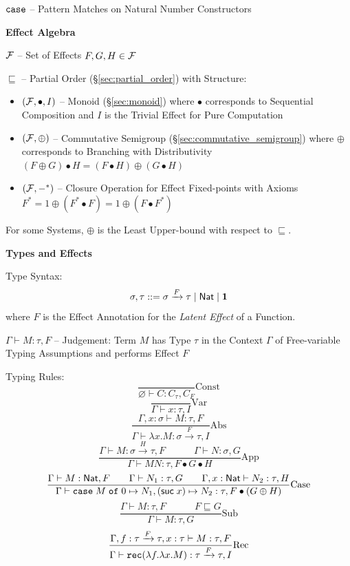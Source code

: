 $\mathtt{case}$ -- Pattern Matches on Natural Number Constructors


\textbf{Effect Algebra}

$\mathcal{F}$ -- Set of Effects $F,G,H \in \mathcal{F}$

$\sqsubseteq$ -- Partial Order (\S\ref{sec:partial_order}) with
Structure:
\begin{itemize}
  \item $(\mathcal{F},\bullet,I)$ -- Monoid (\S\ref{sec:monoid}) where
    $\bullet$ corresponds to Sequential Composition and $I$ is the
    Trivial Effect for Pure Computation
  \item $(\mathcal{F},\oplus)$ -- Commutative Semigroup
    (\S\ref{sec:commutative_semigroup}) where $\oplus$ corresponds to
    Branching with Distributivity $(F \oplus G) \bullet H = (F \bullet
    H) \oplus (G \bullet H)$
  \item $(\mathcal{F},-^*)$ -- Closure Operation for Effect Fixed-points
    with Axioms $F^* = 1 \oplus (F^* \bullet F) = 1 \oplus (F \bullet
    F^*)$
\end{itemize}
For some Systems, $\oplus$ is the Least Upper-bound with respect to
$\sqsubseteq$. %


\textbf{Types and Effects}

Type Syntax:
\[
  \sigma,\tau ::= \sigma \xrightarrow{F} \tau \mid \mathsf{Nat} \mid \mathbf{1}
\]
where $F$ is the Effect Annotation for the \emph{Latent Effect} of a
Function. %

$\Gamma \vdash M:\tau,F$ -- Judgement: Term $M$ has Type $\tau$ in the
Context $\Gamma$ of Free-variable Typing Assumptions and performs
Effect $F$

Typing Rules:
\[
  \frac{}{\varnothing \vdash C : C_\tau,C_F} \mathrm{Const}
\]\[
  \frac{}{\Gamma \vdash x:\tau,I} \mathrm{Var}
\]\[
  \frac{\Gamma, x:\sigma \vdash M:\tau,F}
  {\Gamma \vdash \lambda x.M:\sigma \xrightarrow{F} \tau,I}
  \mathrm{Abs}
\]\[
  \frac{\Gamma \vdash M:\sigma \xrightarrow{H} \tau,F
    \quad\quad\quad \Gamma \vdash N:\sigma,G}
  {\Gamma \vdash M N:\tau, F \bullet G \bullet H}
  \mathrm{App}
\]\[
  \frac{\Gamma \vdash M:\mathsf{Nat},F \quad\quad
    \Gamma \vdash N_1:\tau,G \quad\quad
    \Gamma,x:\mathsf{Nat} \vdash N_2:\tau,H}
  {\Gamma \vdash \mathtt{case}\; M \;\mathtt{of}\; 0 \mapsto N_1,
    (\mathsf{suc}\;x) \mapsto N_2:\tau, F \bullet(G \oplus H)}
  \mathrm{Case}
\]\[
  \frac{\Gamma \vdash M:\tau,F \quad\quad\quad F \sqsubseteq G}
  {\Gamma \vdash M:\tau,G} \mathrm{Sub}
\]\[
  \frac{\Gamma, f:\tau \xrightarrow{F} \tau, x:\tau \vdash M:\tau,F}
  {\Gamma \vdash
    \mathtt{rec}(\lambda f.\lambda x.M):\tau \xrightarrow{F} \tau,I}
  \mathrm{Rec}
\]

